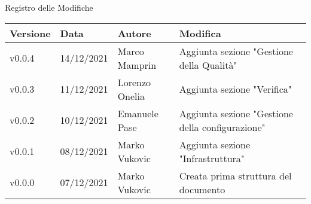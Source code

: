 \begin{center}
  \huge{Registro delle Modifiche}
\end{center}

\begin{center}
  \begin{tabular}{|p{2cm}|p{2cm}|p{3cm}|p{5cm}|}
    \hline
    \textbf{Versione} & \textbf{Data} & \textbf{Autore} & \textbf{Modifica}                    \\ \hline
    v0.0.4            & 14/12/2021    & Marco Mamprin  & Aggiunta sezione "Gestione della Qualità" \\ \hline
    v0.0.3            & 11/12/2021    & Lorenzo Onelia  & Aggiunta sezione "Verifica" \\ \hline
    v0.0.2            & 10/12/2021    & Emanuele Pase   & Aggiunta sezione "Gestione della configurazione" \\ \hline
    v0.0.1            & 08/12/2021    & Marko Vukovic   & Aggiunta sezione "Infrastruttura" \\ \hline
    v0.0.0            & 07/12/2021    & Marko Vukovic   & Creata prima struttura del documento \\ \hline
  \end{tabular}
\end{center}
